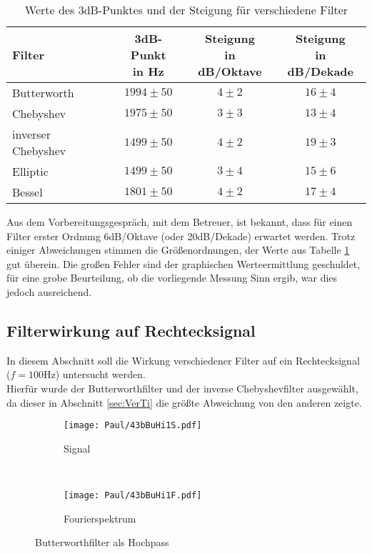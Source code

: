 \begin{table}[h]
    \centering
    \begin{tabular}[h]{l|c|c|c}
        Filter      & \makecell{3dB-Punkt\\in Hz} & \makecell{Steigung\\ in dB/Oktave} & \makecell{Steigung\\ in dB/Dekade} \\ \hline
        Butterworth &    $1994\pm50$   &        $4\pm2$        &      $16\pm4$         \\
        Chebyshev   &    $1975\pm50$   &        $3\pm3$        &      $13\pm4$         \\
        inverser Chebyshev &$1499\pm50$&        $4\pm2$        &      $19\pm3$         \\
        Elliptic    &     $1499\pm50$  &        $3\pm4$        &      $15\pm6$         \\
        Bessel      &     $1801\pm50$  &        $4\pm2$        &      $17\pm4$         \\
    \end{tabular}
    \caption{Werte des 3dB-Punktes und der Steigung für verschiedene Filter}
    \label{tab:Stei}
\end{table}
Aus dem Vorbereitungsgespräch, mit dem Betreuer, ist bekannt, dass für einen Filter erster Ordnung 6dB/Oktave (oder 20dB/Dekade) erwartet werden. Trotz einiger Abweichungen stimmen die Größenordnungen, der Werte aus Tabelle \ref{tab:Stei} gut überein. Die großen Fehler sind der graphischen Werteermittlung geschuldet, für eine grobe Beurteilung, ob die vorliegende Messung Sinn ergib, war dies jedoch ausreichend.




\newpage
\subsection{Filterwirkung auf Rechtecksignal}
In diesem Abschnitt soll die Wirkung verschiedener Filter auf ein Rechtecksignal ($f=100$Hz) untersucht werden.\\
Hierfür wurde der Butterworthfilter und der inverse Chebyshevfilter ausgewählt, da dieser in Abschnitt \ref{sec:VerTi} die größte Abweichung von den anderen zeigte.

\begin{figure}[h]
    \centering
    \begin{subfigure}{0.9\textwidth}
        \centering
        \texttt{[image: Paul/43bBuHi1S.pdf]}
        \caption{Signal}
    \end{subfigure}
    \\
    \begin{subfigure}{0.9\textwidth}
        \centering
        \texttt{[image: Paul/43bBuHi1F.pdf]}
        \caption{Fourierspektrum}
    \end{subfigure}
    \caption{Butterworthfilter als Hochpass}
    \label{fig:43bBuHi1}
\end{figure}

